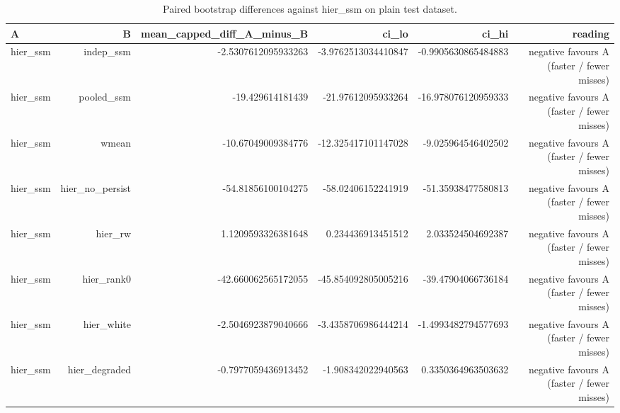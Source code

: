 \begin{table}[htbp]
\centering
\caption{Paired bootstrap differences against hier_ssm on plain test dataset.}
\label{tab:paired_diff}
\begin{tabular}{lrrrrr}
\toprule
A & B & mean_capped_diff_A_minus_B & ci_lo & ci_hi & reading \\
\midrule
hier_ssm & indep_ssm & -2.5307612095933263 & -3.9762513034410847 & -0.9905630865484883 & negative favours A (faster / fewer misses) \\
hier_ssm & pooled_ssm & -19.429614181439 & -21.97612095933264 & -16.978076120959333 & negative favours A (faster / fewer misses) \\
hier_ssm & wmean & -10.67049009384776 & -12.325417101147028 & -9.025964546402502 & negative favours A (faster / fewer misses) \\
hier_ssm & hier_no_persist & -54.81856100104275 & -58.02406152241919 & -51.35938477580813 & negative favours A (faster / fewer misses) \\
hier_ssm & hier_rw & 1.1209593326381648 & 0.234436913451512 & 2.033524504692387 & negative favours A (faster / fewer misses) \\
hier_ssm & hier_rank0 & -42.660062565172055 & -45.854092805005216 & -39.47904066736184 & negative favours A (faster / fewer misses) \\
hier_ssm & hier_white & -2.5046923879040666 & -3.4358706986444214 & -1.4993482794577693 & negative favours A (faster / fewer misses) \\
hier_ssm & hier_degraded & -0.7977059436913452 & -1.908342022940563 & 0.3350364963503632 & negative favours A (faster / fewer misses) \\
\bottomrule
\end{tabular}
\end{table}
